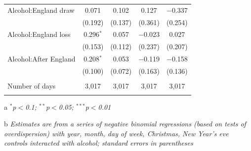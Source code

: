 \documentclass[12pt, letterpaper]{article}
\begin{document}
{\begin{table}[htp]
{\begin{threeparttable}
\begin{tabular}{@{\extracolsep{5pt}}lcccc}
  Alcohol:England draw & 0.071 & 0.102 & 0.127 & $-$0.337 \\ 
  & (0.192) & (0.137) & (0.361) & (0.254) \\ 
  Alcohol:England loss & 0.296$^{*}$ & 0.057 & $-$0.023 & 0.027 \\ 
  & (0.153) & (0.112) & (0.237) & (0.207) \\ 
  Alcohol:After England & 0.208$^{*}$ & 0.053 & $-$0.119 & $-$0.158 \\ 
  & (0.100) & (0.072) & (0.163) & (0.136) \\ 
 \hline \\[-1.8ex] 
Number of days & 3,017 & 3,017 & 3,017 & 3,017 \\ 
\hline 
\hline \\[-1.8ex] 
\end{tabular} 
\begin{tablenotes}
     \item[a] \textit{$^{*}$p$<$0.1; $^{**}$p$<$0.05; $^{***}$p$<$0.01}
      \item[b] \textit{Estimates are from a series of negative binomial regressions (based on tests of overdispersion)  with year, month, day of week, Christmas, New Year's eve controls interacted with alcohol; standard errors in parentheses}
    \end{tablenotes}
\end{threeparttable} }
\end{table}

\newpage

}
\end{document}
